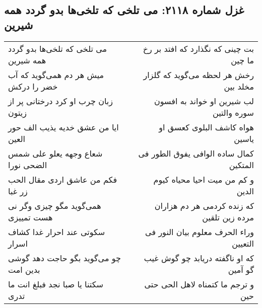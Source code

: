 \begin{center}
\section*{غزل شماره ۲۱۱۸: می تلخی که تلخی‌ها بدو گردد همه شیرین}
\label{sec:2118}
\begin{longtable}{l p{0.5cm} r}
می تلخی که تلخی‌ها بدو گردد همه شیرین
&&
بت چینی که نگذارد که افتد بر رخ ما چین
\\
میش هر دم همی‌گوید که آب خضر را درکش
&&
رخش هر لحظه می‌گوید که گلزار مخلد بین
\\
زبان چرب او کرد درختانی پر از زیتون
&&
لب شیرین او خواند به افسون سوره والتین
\\
ایا من عشق خدیه یذیب الف حور العین
&&
هواه کاشف البلوی کعسق او یاسین
\\
شعاع وجهه یعلو علی شمس الضحی نورا
&&
کمال ساده الوافی یفوق الطور فی المتکین
\\
فکم من عاشق اردی مقال الحب زر غبا
&&
و کم من میت احیا محیاه کیوم الدین
\\
همی‌گوید مگو چیزی وگر نی هست تمییزی
&&
که زنده کردمی هر دم هزاران مرده زین تلقین
\\
سکوتی عند احرار غدا کشاف اسرار
&&
وراء الحرف معلوم بیان النور فی التعیین
\\
چو می‌گوید بگو حاجت دهد گوشی بدین امت
&&
که او ناگفته دریابد چو گوش غیب گو آمین
\\
سکتنا یا صبا نجد فبلغ انت ما تدری
&&
و ترجم ما کتمناه لاهل الحی حتی حین
\\
\end{longtable}
\end{center}
